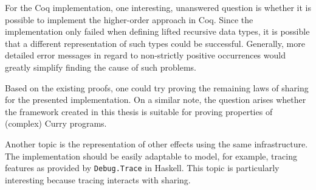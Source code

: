 \documentclass[a4paper, 11pt, fleqn, twoside]{scrreprt}
\newcommand{\hinl}[1]{\texttt{#1}}
\begin{document}
For the Coq implementation, one interesting, unanswered question is whether it is possible to implement the higher-order approach in Coq.
Since the implementation only failed when defining lifted recursive data types, it is possible that a different representation of such types could be successful.
Generally, more detailed error messages in regard to non-strictly positive occurrences would greatly simplify finding the cause of such problems.

Based on the existing proofs, one could try proving the remaining laws of sharing for the presented implementation. On a similar note, the question arises whether the framework created in this thesis is suitable for proving properties of (complex) Curry programs.

Another topic is the representation of other effects using the same infrastructure.
The implementation should be easily adaptable to model, for example, tracing features as provided by \hinl{Debug.Trace} in Haskell.
This topic is particularly interesting because tracing interacts with sharing.


\appendix
\end{document}
